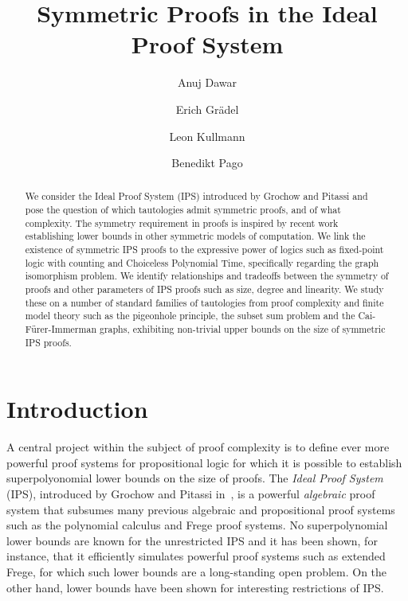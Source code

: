\documentclass[a4paper,UKenglish,cleveref, autoref, thm-restate]{lipics-v2021}
\title{ Symmetric Proofs in the Ideal Proof System} %
\author{Anuj Dawar}{Department of Computer Science and Technology, University of Cambridge, UK}{anuj.dawar@cl.cam.ac.uk}{}{}
\author{Erich Grädel}{Mathematical Foundations of Computer Science, RWTH Aachen University, Germany}{graedel@informatik.rwth-aachen.de}{}{}
\author{Leon Kullmann}{RWTH Aachen University, Germany}{leon.kullmann@rwth-aachen.de}{}{}
\author{Benedikt Pago}{Department of Computer Science and Technology, University of Cambridge, UK}{btp26@cam.ac.uk}{}{}%
\begin{document}
	\maketitle
	
	\begin{abstract}
          We consider the Ideal Proof System (IPS) introduced by Grochow and Pitassi and 
          pose the question of which tautologies admit symmetric proofs, and of what complexity. The symmetry requirement in proofs is inspired by recent work establishing lower bounds in other symmetric models of computation.
		We link the existence of symmetric IPS proofs to the expressive power of logics such as fixed-point logic with counting and Choiceless Polynomial Time, specifically regarding the graph isomorphism problem.  We identify relationships and tradeoffs between the symmetry of proofs and other parameters of IPS proofs such as size, degree and linearity.  We study these on a number of standard families of tautologies from proof complexity and finite model theory such as the pigeonhole principle, the subset sum problem and the Cai-Fürer-Immerman graphs, exhibiting non-trivial upper bounds on the size of symmetric IPS proofs.
	\end{abstract}
	
	
	\section{Introduction}
	A central project within the subject of proof complexity \cite{pitassi, segerlind, krajicekBook} is to define ever more powerful proof systems for propositional logic for which it is possible to establish superpolyonomial lower bounds on the size of proofs. The \emph{Ideal Proof System} (IPS), introduced by Grochow and Pitassi in~\cite{IPS}, is a powerful \emph{algebraic} proof system that subsumes many previous algebraic and propositional proof systems such as the polynomial calculus and Frege proof systems. No superpolynomial lower bounds are known for the unrestricted IPS and it has been shown, for instance, that it efficiently simulates powerful proof systems such as extended Frege, for which such lower bounds are a long-standing open problem.  On the other hand, lower bounds have been shown for interesting restrictions of IPS.
	
\end{document}
